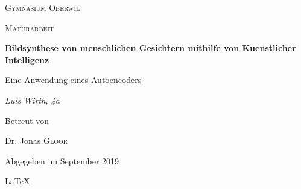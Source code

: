 \documentclass[../main]{subfiles}
\begin{document}
\begin{titlepage}
    \centering
    
    {\scshape\LARGE Gymnasium Oberwil\par}
    \vspace{1cm}
    {\scshape\Large Maturarbeit\par}
    \vspace{1.5cm}
    {\huge\bfseries Bildsynthese von menschlichen Gesichtern mithilfe von Kuenstlicher Intelligenz\par}
    \vspace{0.2cm}
    {\large Eine Anwendung eines Autoencoders\par}
    \vspace{2cm}
    {\Large\itshape Luis Wirth, 4a\par}
    \vfill
    Betreut von\par
    Dr. Jonas \textsc{Gloor}
    
    \vfill
    {\large Abgegeben im September 2019\par}
    \LaTeX{}
\end{titlepage}
\end{document}

